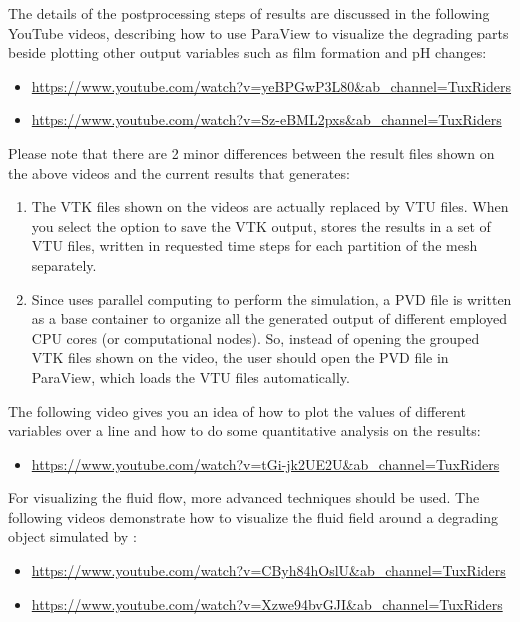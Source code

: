 The details of the postprocessing steps of \biodeg{} results are discussed in the following YouTube videos, describing how to use ParaView to visualize the degrading parts beside plotting other output variables such as film formation and pH changes:

\begin{itemize}
\item
\url{https://www.youtube.com/watch?v=yeBPGwP3L80&ab_channel=TuxRiders}
\item
\url{https://www.youtube.com/watch?v=Sz-eBML2pxs&ab_channel=TuxRiders}
\end{itemize}

Please note that there are 2 minor differences between the result files shown on the above videos and the current results that \biodeg{} generates:

\begin{enumerate}
\item
The VTK files shown on the videos are actually replaced by VTU files. When you select the option to save the VTK output, \biodeg{} stores the results in a set of VTU files, written in requested time steps for each partition of the mesh separately.
\item
Since \biodeg{} uses parallel computing to perform the simulation, a PVD file is written as a base container to organize all the generated output of different employed CPU cores (or computational nodes). So, instead of opening the grouped VTK files shown on the video, the user should open the PVD file in ParaView, which loads the VTU files automatically.
\end{enumerate}

The following video gives you an idea of how to plot the values of different variables over a line and how to do some quantitative analysis on the results:

\begin{itemize}
\item
\url{https://www.youtube.com/watch?v=tGi-jk2UE2U&ab_channel=TuxRiders}
\end{itemize}

For visualizing the fluid flow, more advanced techniques should be used. The following videos demonstrate how to visualize the fluid field around a degrading object simulated by \biodeg{}:

\begin{itemize}
\item
\url{https://www.youtube.com/watch?v=CByh84hOslU&ab_channel=TuxRiders}
\item
\url{https://www.youtube.com/watch?v=Xzwe94bvGJI&ab_channel=TuxRiders}
\end{itemize}
